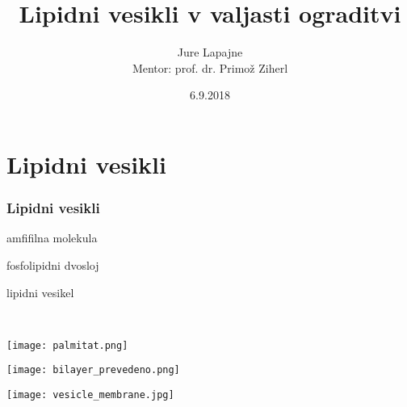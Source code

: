 \documentclass[slovene]{beamer}
\title{Lipidni vesikli v valjasti ograditvi}
\author[Jure Lapajne]{Jure Lapajne\\{\small Mentor: prof. dr. Primož Ziherl}}
\date{6.9.2018}
\begin{document}
	
	\frame{\titlepage}
	\setlength{\abovedisplayskip}{3pt}
	\setlength{\belowdisplayskip}{3pt}


	
\section{Lipidni vesikli}

\begin{frame}
	\frametitle{Lipidni vesikli}
	\begin{minipage}[]{0.17\linewidth}
		amfifilna molekula
	\end{minipage}%
	\begin{minipage}{0.12\linewidth}
	\end{minipage}%
	\begin{minipage}[]{0.35\linewidth}
		\centering
		fosfolipidni dvosloj
	\end{minipage}
	\begin{minipage}{0.12\linewidth}
	\end{minipage}%
	\begin{minipage}[]{0.2\linewidth}
		lipidni vesikel	
	\end{minipage}
	\\
	\vspace{0.2cm}
	
	\begin{minipage}[]{0.17\linewidth}
		\centering
		\texttt{[image: palmitat.png]}
	\end{minipage}%
	\begin{minipage}{0.12\linewidth}
	\end{minipage}%
	\begin{minipage}[]{0.35\linewidth}
		\centering
		\texttt{[image: bilayer\_prevedeno.png]}	
	\end{minipage}
	\begin{minipage}{0.12\linewidth}
	\end{minipage}%
	\begin{minipage}[]{0.3\linewidth}
		\centering
		\texttt{[image: vesicle\_membrane.jpg]}\\
		

\end{minipage}
\end{frame}
\end{document}

